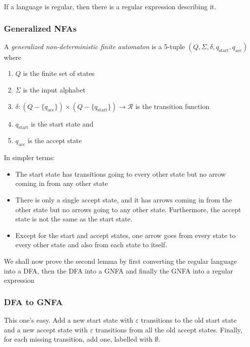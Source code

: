 \begin{lemma}
    If a language is regular, then there is a regular expression describing it.
\end{lemma}

\subsubsection*{Generalized NFAs}
\begin{definition}[GNFA]
    A \textit{generalized non-deterministic finite automaton} is a 5-tuple $(Q,\Sigma,\delta,q_\text{start}, q_\text{acc})$ where 
    \begin{enumerate}
        \item $Q$ is the finite set of states 
        \item $\Sigma$ is the input alphabet 
        \item $\delta: (Q-\{q_\text{acc}\})\times(Q-\{q_\text{start}\})\to\mathcal{R}$ is the transition function
        \item $q_\text{start}$ is the start state and 
        \item $q_\text{acc}$ is the accept state
    \end{enumerate}
\end{definition}

In simpler terms:
\begin{itemize}
    \item The start state has transitions going to every other state but no arrow coming in from any other state 
    \item There is only a single accept state, and it has arrows coming in from the other state but no arrows going to any other state. Furthermore, the accept state is not the same as the start state.
    \item Except for the start and accept states, one arrow goes from every state to every other state and also from each state to itself.
\end{itemize}

We shall now prove the second lemma by first converting the regular language into a DFA, then the DFA into a GNFA and finally the GNFA into a regular expression 

\subsubsection*{DFA to GNFA}
This one's easy. Add a new start state with $\varepsilon$ transitions to the old start state and a new accept state with $\varepsilon$ transitions from all the old accept states. Finally, for each missing transition, add one, labelled with $\emptyset$.

